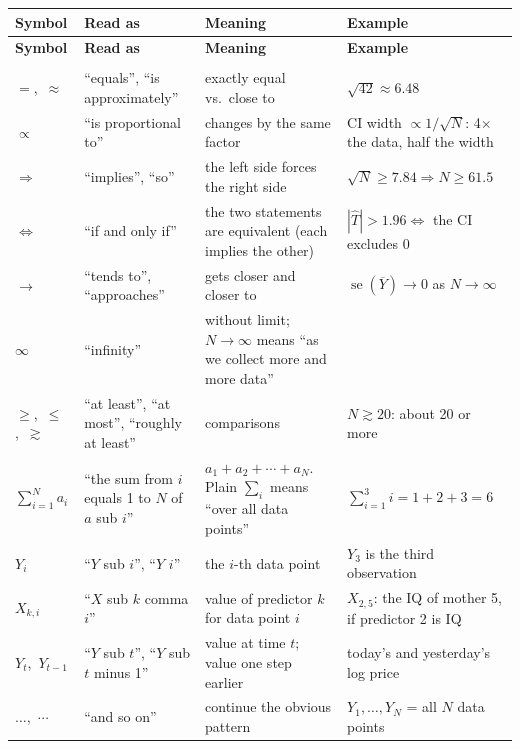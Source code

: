 \documentclass[11pt]{article}
\newcommand{\se}{\operatorname{se}}
\newcommand{\Ybar}{\overline{Y}}
\begin{document}
{\small
\setlength{\tabcolsep}{4pt}
\renewcommand{\arraystretch}{1.3}
\newcommand{\gh}[1]{\multicolumn{4}{@{}l}{\color{accent}\bfseries\normalsize #1}\\\midrule}
\begin{longtable}{@{}>{\raggedright\arraybackslash}p{2.5cm}>{\raggedright\arraybackslash}p{3.0cm}>{\raggedright\arraybackslash}p{5.5cm}>{\raggedright\arraybackslash}p{4.5cm}@{}}
\toprule
\textbf{Symbol} & \textbf{Read as} & \textbf{Meaning} & \textbf{Example}\\
\midrule
\endfirsthead
\toprule
\textbf{Symbol} & \textbf{Read as} & \textbf{Meaning} & \textbf{Example}\\
\midrule
\endhead
\bottomrule
\endfoot
\gh{A. General math}
$=$,\ $\approx$ & ``equals'', ``is approximately'' & exactly equal vs.\ close to & $\sqrt{42}\approx6.48$\\
$\propto$ & ``is proportional to'' & changes by the same factor & CI width $\propto1/\sqrt N$: 4$\times$ the data, half the width\\
$\Longrightarrow$ & ``implies'', ``so'' & the left side forces the right side & $\sqrt N\ge7.84\Longrightarrow N\ge61.5$\\
$\iff$ & ``if and only if'' & the two statements are equivalent (each implies the other) & $|\hat T|>1.96\iff$ the CI excludes 0\\
$\to$ & ``tends to'', ``approaches'' & gets closer and closer to & $\se(\Ybar)\to0$ as $N\to\infty$\\
$\infty$ & ``infinity'' & without limit; $N\to\infty$ means ``as we collect more and more data'' & \\
$\ge$,\ $\le$,\ $\gtrsim$ & ``at least'', ``at most'', ``roughly at least'' & comparisons & $N\gtrsim20$: about 20 or more\\
$\sum_{i=1}^N a_i$ & ``the sum from $i$ equals 1 to $N$ of $a$ sub $i$'' & $a_1+a_2+\cdots+a_N$. Plain $\sum_i$ means ``over all data points'' & $\sum_{i=1}^3 i=1+2+3=6$\\
$Y_i$ & ``$Y$ sub $i$'', ``$Y$ $i$'' & the $i$-th data point & $Y_3$ is the third observation\\
$X_{k,i}$ & ``$X$ sub $k$ comma $i$'' & value of predictor $k$ for data point $i$ & $X_{2,5}$: the IQ of mother 5, if predictor 2 is IQ\\
$Y_t$,\ $Y_{t-1}$ & ``$Y$ sub $t$'', ``$Y$ sub $t$ minus 1'' & value at time $t$; value one step earlier & today's and yesterday's log price\\
$\dots$,\ $\cdots$ & ``and so on'' & continue the obvious pattern & $Y_1,\dots,Y_N$ = all $N$ data points\\

\end{longtable}}
\end{document}
